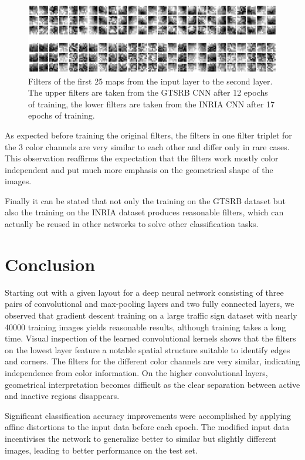 \documentclass[11pt, a4paper]{article}
\begin{document}
\begin{figure}[h!]
	\centering
	\includegraphics[width=1\textwidth]{filter_visualizations/gtsrb_vs_inria_filters}
	\caption{Filters of the first 25 maps from the input layer to the second layer. The upper filters are taken from the GTSRB CNN after 12 epochs of training, the lower filters are taken from the INRIA CNN after 17 epochs of training.}
	\label{fig:gtsrb_vs_inria_filters}
\end{figure}

As expected before training the original filters, the filters in one filter triplet for the 3 color channels are very similar to each other and differ only in rare cases. This observation reaffirms the expectation that the filters work mostly color independent and put much more emphasis on the geometrical shape of the images.

Finally it can be stated that not only the training on the GTSRB dataset but also the training on the INRIA dataset produces reasonable filters, which can actually be reused in other networks to solve other classification tasks.


\section{Conclusion}
Starting out with a given layout for a deep neural network consisting of three pairs of convolutional and max-pooling layers and two fully connected layers, we observed that gradient descent training on a large traffic sign dataset with nearly 40000 training images yields reasonable results, although training takes a long time. Visual inspection of the learned convolutional kernels shows that the filters on the lowest layer feature a notable spatial structure suitable to identify edges and corners. The filters for the different color channels are very similar, indicating independence from color information. On the higher convolutional layers, geometrical interpretation becomes difficult as the clear separation between active and inactive regions disappears.

Significant classification accuracy improvements were accomplished by applying affine distortions to the input data before each epoch. The modified input data incentivises the network to generalize better to similar but slightly different images, leading to better performance on the test set.
\end{document}
